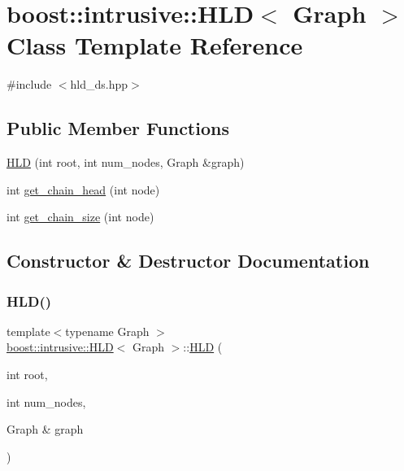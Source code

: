 \hypertarget{classboost_1_1intrusive_1_1HLD}{}\section{boost\+:\+:intrusive\+:\+:H\+LD$<$ Graph $>$ Class Template Reference}
\label{classboost_1_1intrusive_1_1HLD}


{\ttfamily \#include $<$hld\+\_\+ds.\+hpp$>$}

\subsection*{Public Member Functions}
\begin{DoxyCompactItemize}
\item 
\hyperlink{classboost_1_1intrusive_1_1HLD_a57f95a8d4653ba18178223b24a8b1fcd}{H\+LD} (int root, int num\+\_\+nodes, Graph \&graph)
\item 
int \hyperlink{classboost_1_1intrusive_1_1HLD_af7431ec20f7c788119f1136916e7c4a8}{get\+\_\+chain\+\_\+head} (int node)
\item 
int \hyperlink{classboost_1_1intrusive_1_1HLD_a52a0f91efab2e5fcee4e715dffb114cf}{get\+\_\+chain\+\_\+size} (int node)
\end{DoxyCompactItemize}


\subsection{Constructor \& Destructor Documentation}
\mbox{\label{classboost_1_1intrusive_1_1HLD_a57f95a8d4653ba18178223b24a8b1fcd}} 
\subsubsection{\texorpdfstring{H\+L\+D()}{HLD()}}
{\footnotesize\ttfamily template$<$typename Graph $>$ \\
\hyperlink{classboost_1_1intrusive_1_1HLD}{boost\+::intrusive\+::\+H\+LD}$<$ Graph $>$\+::\hyperlink{classboost_1_1intrusive_1_1HLD}{H\+LD} (\begin{DoxyParamCaption}\item[{int}]{root,  }\item[{int}]{num\+\_\+nodes,  }\item[{Graph \&}]{graph }\end{DoxyParamCaption})\hspace{0.3cm}{\ttfamily [inline]}}


